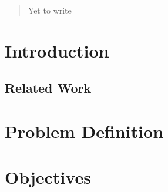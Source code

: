 \documentclass[11pt]{article}
\begin{document}
\propportada                        %
\proppagfirmas                      %
\thispagestyle{empty}
\tableofcontents                    %
\newpage
\sloppy
\newpage


\begin{abstract}
Yet to write

\begin{comment}
Normalmente, cuando se presenta un documento de este tipo o un artículo, es
importante incluir un {\it Resumen}, que en alrededor de 200 palabras 
informa al
lector los aspectos más relevantes del trabajo. Esto es de importancia, por
ejemplo, para buscar bibliografía o seleccionar aquellos documentos que en
determinado momento son de interés para alguien.  

Las preguntas a contestar en el Resumen son las siguientes:
\begin{itemize}
	\item ?`Para qué Maestría es la Propuesta?
	\item ?`Cuál es la el contexto y situación problemática en la que se encuentra?
	\item ?`Qué problema particular se piensa resolver? ¿por qué se quiere
	  resolver  y para qué?
	\item ?`Qué se ha hecho antes?
	\item ?`Cómo se piensa resolver?
	\item ?`Qué se espera obtener?
\end{itemize}
\end{comment}
\end{abstract}


\section{Introduction}


	\subsection{Related Work}
	\label{subsec:RelatedWork}
	

\section{Problem Definition}


\section{Objectives}

\end{document}
